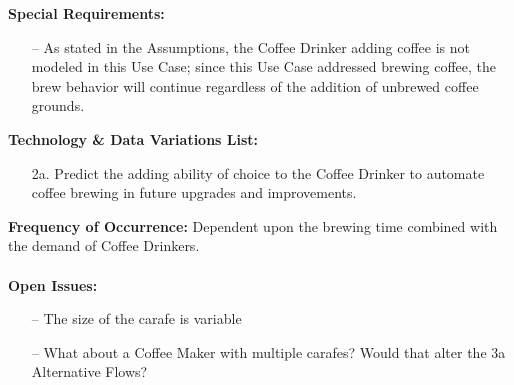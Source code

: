 \documentclass[letterpaper]{article}
\begin{document}
\textbf{Special Requirements:  }
\begin{itemize}
\item [--]As stated in the Assumptions, the Coffee Drinker adding
coffee
is not modeled in this Use Case; since this Use Case addressed brewing
coffee, the brew behavior will continue regardless of the addition of
unbrewed coffee grounds.
\end{itemize}
\textbf{Technology \& Data Variations List: }
\begin{itemize}
\item[2a.] Predict the adding ability of choice to the Coffee Drinker
to automate coffee brewing in future upgrades and improvements.
\end{itemize}
\textbf{Frequency of Occurrence: } Dependent upon the brewing time
combined with the demand of Coffee Drinkers.\\\\
\textbf{Open Issues: }
\begin{itemize}
\item[--]The size of the carafe is variable
\item[--]What about a Coffee Maker with multiple carafes?  Would that
alter the 3a Alternative Flows?
\end{itemize}
\end{document}
